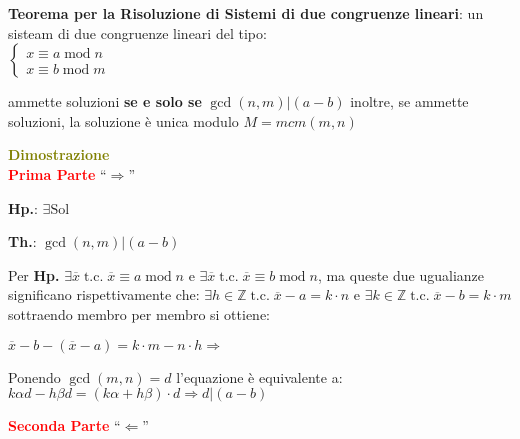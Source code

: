 \newpage
\begin{flushleft}
    \textbf{Teorema per la Risoluzione di Sistemi di due congruenze lineari}: un sisteam di due congruenze lineari del tipo: \\
    $\begin{cases}
        x \equiv a \; \text{mod} \; n \\
        x \equiv b \; \text{mod} \; m
    \end{cases}$ 

    ammette soluzioni \textbf{se e solo se} $\gcd (n, m) | (a - b)$ inoltre, se ammette soluzioni, la soluzione è unica modulo $M = mcm(m, n)$

    \begin{boxA}
        \textcolor{olive}{\textbf{Dimostrazione}} \\
        \textcolor{red}{\textbf{Prima Parte}} ``$\Rightarrow$''

        {\centering
            \begin{minipage}[t]{0.45\textwidth}
                \textbf{Hp.}: $\exists \text{Sol}$
            \end{minipage}
            \hfill
            \begin{minipage}[t]{0.45\textwidth}
                \textbf{Th.}: $\gcd (n, m) | (a - b)$
            \end{minipage}
        \par}

        Per \textbf{Hp.} $\exists \overline{x} \; \text{t.c.} \; \overline{x} \equiv a \; \text{mod} \; n$ e $\exists \overline{x} \; \text{t.c.} \; \overline{x} \equiv b \; \text{mod} \; n$, ma queste due ugualianze significano rispettivamente che: $\exists h \in \mathbb{Z} \; \text{t.c.} \; \overline{x} - a = k \cdot n$ e $\exists k \in \mathbb{Z} \; \text{t.c.} \; \overline{x} - b = k \cdot m$ sottraendo membro per membro si ottiene:

        {\centering
            $\overline{x} - b - (\overline{x} - a) = k \cdot m - n \cdot h \Longrightarrow$ 
        \par}
        Ponendo $\gcd (m, n) = d$ l'equazione è equivalente a: $k\alpha d - h \beta d = (k\alpha + h\beta) \cdot d \Rightarrow d|(a - b)$

        \textcolor{red}{\textbf{Seconda Parte}} ``$\Leftarrow$''


\end{boxA}
\end{flushleft}
